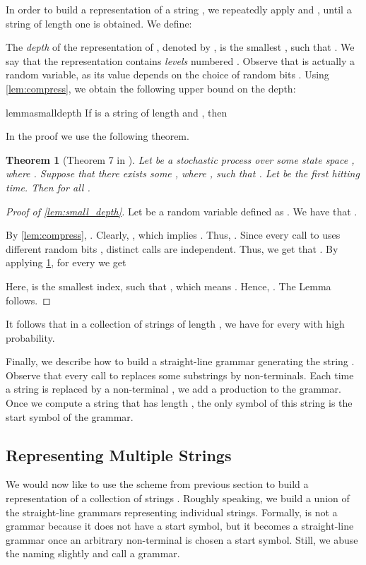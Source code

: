 \documentclass[a4paper]{article}
\newtheorem{theorem}{Theorem}[section]
\theoremstyle{remark}
\begin{document}
In order to build a representation of a string , we repeatedly apply  and , until a string of length one is obtained.
We define:

The \emph{depth} of the representation of , denoted by , is the smallest , such that .
We say that the representation contains  \emph{levels} numbered .
Observe that  is actually a random variable, as its value depends on the choice of random bits .
Using \cref{lem:compress}, we obtain the following upper bound on the depth:

\begin{restatable}{lemma}{smalldepth}\label{lem:small_depth}
If  is a string of length  and , then

\end{restatable}
In the proof we use the following theorem.

\begin{theorem}[Theorem 7 in \cite{Lehre:2013}]\label{thm:drift}
Let  be a stochastic process over some state space , where .
Suppose that there exists some , where , such that .
Let  be the first hitting time.
Then  for all .
\end{theorem}

\begin{proof}[Proof of \cref{lem:small_depth}]
Let  be a random variable defined as .
We have that .

By \cref{lem:compress}, .
Clearly, , which implies .
Thus, .
Since every call to  uses different random bits , distinct calls are independent.
Thus,  we get that .
By applying \cref{thm:drift}, for every  we get

Here,  is the smallest index, such that , which means .
Hence, .
The Lemma follows.
\end{proof}

It follows that in a collection  of  strings of length , we have  
for every  with high probability.

Finally, we describe how to build a straight-line grammar generating the string .
Observe that every call to  replaces some substrings by non-terminals.
Each time a string  is replaced by a non-terminal , we add a production  to the grammar.
Once we compute a string  that has length , the only symbol of this string is the start symbol of the grammar.

\subsection{Representing Multiple Strings}\label{sec:persistent_ds}
We would now like to use the scheme from previous section to build a representation of a collection of strings .
Roughly speaking, we build a union  of the straight-line grammars representing individual strings.
Formally,  is not a grammar because it does not have a start symbol, but it becomes a straight-line grammar once
an arbitrary non-terminal is chosen a start symbol.
Still, we abuse the naming slightly and call  a grammar.
\end{document}
